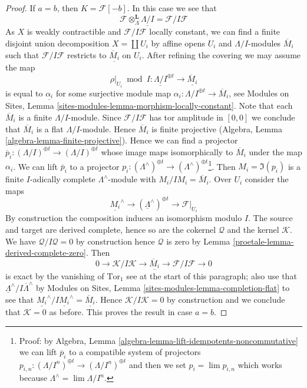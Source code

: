 \begin{proof}
\medskip\noindent
If $a = b$, then $K = \mathcal{F}[-b]$. In this case we see that
$$
\mathcal{F} \otimes_\Lambda^\mathbf{L} \underline{\Lambda/I} =
\mathcal{F}/I\mathcal{F}
$$
As $X$ is weakly contractible and $\mathcal{F}/I\mathcal{F}$
locally constant, we can find a finite disjoint
union decomposition $X = \coprod U_i$ by affine opens $U_i$
and $\Lambda/I$-modules $\overline{M}_i$
such that $\mathcal{F}/I\mathcal{F}$ restricts to
$\underline{\overline{M}_i}$ on $U_i$. After refining the covering
we may assume the map
$$
\rho|_{U_i} \bmod I :
\underline{\Lambda/I}^{\oplus t}
\longrightarrow
\underline{\overline{M}_i}
$$
is equal to $\underline{\alpha_i}$ for some surjective module map
$\alpha_i : \Lambda/I^{\oplus t} \to \overline{M}_i$, see
Modules on Sites, Lemma \ref{sites-modules-lemma-morphism-locally-constant}.
Note that each $\overline{M}_i$ is a finite $\Lambda/I$-module.
Since $\mathcal{F}/I\mathcal{F}$ has tor amplitude in $[0, 0]$
we conclude that $\overline{M}_i$ is a flat $\Lambda/I$-module.
Hence $\overline{M}_i$ is finite projective
(Algebra, Lemma \ref{algebra-lemma-finite-projective}).
Hence we can find a projector
$\overline{p}_i : (\Lambda/I)^{\oplus t} \to (\Lambda/I)^{\oplus t}$
whose image maps isomorphically to $\overline{M}_i$ under the map $\alpha_i$.
We can lift $\overline{p}_i$ to a projector
$p_i : (\Lambda^\wedge)^{\oplus t} \to
(\Lambda^\wedge)^{\oplus t}$\footnote{Proof: by
Algebra, Lemma \ref{algebra-lemma-lift-idempotents-noncommutative}
we can lift $\overline{p}_i$ to a compatible system of
projectors $p_{i, n} : (\Lambda/I^n)^{\oplus t} \to (\Lambda/I^n)^{\oplus t}$
and then we set $p_i = \lim p_{i, n}$ which works because
$\Lambda^\wedge = \lim \Lambda/I^n$.}.
Then $M_i = \Im(p_i)$ is a finite $I$-adically complete
$\Lambda^\wedge$-module with $M_i/IM_i = \overline{M}_i$.
Over $U_i$ consider the maps
$$
\underline{M_i}^\wedge \to
(\underline{\Lambda}^\wedge)^{\oplus t} \to
\mathcal{F}|_{U_i}
$$
By construction the composition induces an isomorphism modulo $I$.
The source and target are derived complete, hence so are the cokernel
$\mathcal{Q}$ and the kernel $\mathcal{K}$. We have
$\mathcal{Q}/I\mathcal{Q} = 0$ by construction hence $\mathcal{Q}$
is zero by Lemma \ref{proetale-lemma-derived-complete-zero}.
Then
$$
0 \to \mathcal{K}/I\mathcal{K} \to
\underline{\overline{M}_i}
\to \mathcal{F}/I\mathcal{F} \to 0
$$
is exact by the vanishing of $\text{Tor}_1$ see at the start of this
paragraph; also use that
$\underline{\Lambda}^\wedge/I\overline{\Lambda}^\wedge$ by
Modules on Sites, Lemma \ref{sites-modules-lemma-completion-flat}
to see that
$\underline{M_i}^\wedge/I\underline{M_i}^\wedge = \underline{\overline{M}_i}$.
Hence $\mathcal{K}/I\mathcal{K} = 0$ by construction and we conclude
that $\mathcal{K} = 0$ as before. This proves the result in case $a = b$.


\end{proof}
